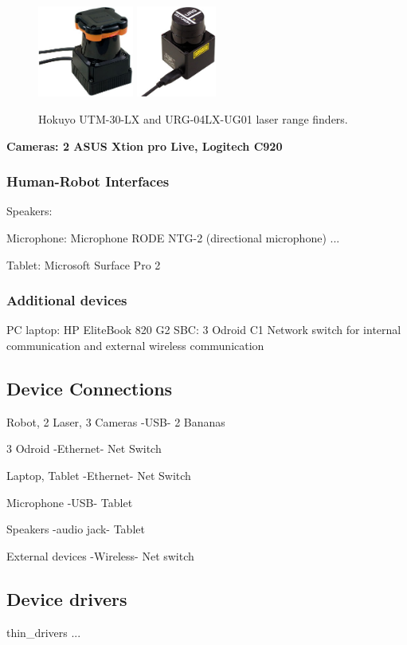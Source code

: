 \begin{figure}[h!]
\begin{center}
\includegraphics[height=3cm]{fig/utm30lx.jpg}
\includegraphics[height=3cm]{fig/urg04lxug01.jpg}
\end{center}
\caption{Hokuyo UTM-30-LX and URG-04LX-UG01 laser range finders.}
\label{fig:segway}
\end{figure}

{\bf Cameras: 2 ASUS Xtion pro Live, Logitech C920}



\subsubsection{Human-Robot Interfaces}

Speakers:

Microphone: Microphone RODE NTG-2  (directional microphone) ...

Tablet: Microsoft Surface Pro 2

\subsubsection{Additional devices}
PC laptop: HP EliteBook 820 G2
SBC: 3 Odroid C1
Network switch for internal communication and external wireless communication




\subsection{Device Connections}

Robot, 2 Laser, 3 Cameras -USB- 2 Bananas

3 Odroid  -Ethernet- Net Switch

Laptop, Tablet -Ethernet- Net Switch

Microphone -USB- Tablet

Speakers -audio jack- Tablet

External devices -Wireless- Net switch



\subsection{Device drivers}

thin\_drivers ...






